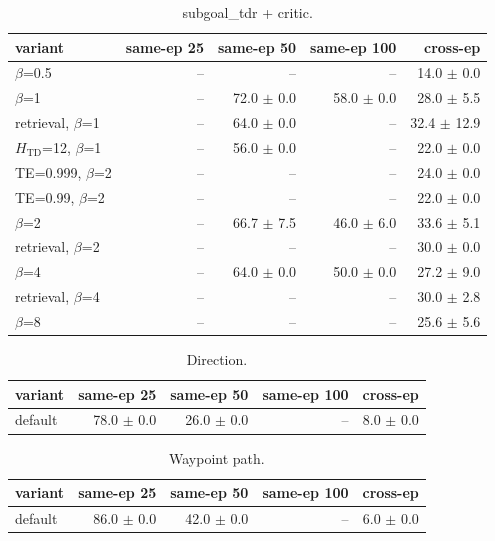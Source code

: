 \begin{table}[H]
\centering\small
\caption{subgoal\_tdr + critic.}
\label{tab:gas-mpc-subgoal_tdr-crit-perseed-n50}
\begin{tabular}{lrrrr}
\toprule
variant & same-ep 25 & same-ep 50 & same-ep 100 & cross-ep \\
\midrule
$\beta$=0.5 & -- & -- & -- & 14.0 $\pm$ 0.0 \\
$\beta$=1 & -- & 72.0 $\pm$ 0.0 & 58.0 $\pm$ 0.0 & 28.0 $\pm$ 5.5 \\
retrieval, $\beta$=1 & -- & 64.0 $\pm$ 0.0 & -- & 32.4 $\pm$ 12.9 \\
$H_{\mathrm{TD}}$=12, $\beta$=1 & -- & 56.0 $\pm$ 0.0 & -- & 22.0 $\pm$ 0.0 \\
TE=0.999, $\beta$=2 & -- & -- & -- & 24.0 $\pm$ 0.0 \\
TE=0.99, $\beta$=2 & -- & -- & -- & 22.0 $\pm$ 0.0 \\
$\beta$=2 & -- & 66.7 $\pm$ 7.5 & 46.0 $\pm$ 6.0 & 33.6 $\pm$ 5.1 \\
retrieval, $\beta$=2 & -- & -- & -- & 30.0 $\pm$ 0.0 \\
$\beta$=4 & -- & 64.0 $\pm$ 0.0 & 50.0 $\pm$ 0.0 & 27.2 $\pm$ 9.0 \\
retrieval, $\beta$=4 & -- & -- & -- & 30.0 $\pm$ 2.8 \\
$\beta$=8 & -- & -- & -- & 25.6 $\pm$ 5.6 \\
\bottomrule
\end{tabular}
\end{table}

\begin{table}[H]
\centering\small
\caption{Direction.}
\label{tab:gas-mpc-dir-perseed-n50}
\begin{tabular}{lrrrr}
\toprule
variant & same-ep 25 & same-ep 50 & same-ep 100 & cross-ep \\
\midrule
default & 78.0 $\pm$ 0.0 & 26.0 $\pm$ 0.0 & -- & 8.0 $\pm$ 0.0 \\
\bottomrule
\end{tabular}
\end{table}

\begin{table}[H]
\centering\small
\caption{Waypoint path.}
\label{tab:gas-mpc-path-perseed-n50}
\begin{tabular}{lrrrr}
\toprule
variant & same-ep 25 & same-ep 50 & same-ep 100 & cross-ep \\
\midrule
default & 86.0 $\pm$ 0.0 & 42.0 $\pm$ 0.0 & -- & 6.0 $\pm$ 0.0 \\
\bottomrule
\end{tabular}
\end{table}

